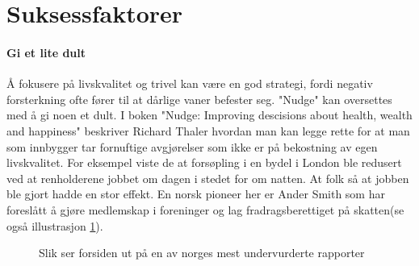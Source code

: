 \documentclass[12pt]{memoir} %
\begin{document}
	\section{Suksessfaktorer}
		\paragraph{Gi et lite dult\\}
			Å fokusere på livskvalitet og trivel kan være en god strategi, fordi negativ forsterkning ofte fører til at dårlige vaner befester seg. "Nudge" kan oversettes med å gi noen et dult. I boken "Nudge: Improving descisions about health, wealth and happiness"\cite{nudge} beskriver Richard Thaler hvordan man kan legge rette for at man som innbygger tar fornuftige avgjørelser som ikke er på bekostning av egen livskvalitet. For eksempel viste de at forsøpling i en bydel i London ble redusert ved at renholderene jobbet om dagen i stedet for om natten\cite{nudge}. At folk så at jobben ble gjort hadde en stor effekt. En norsk pioneer her er Ander Smith som har foreslått å gjøre medlemskap i foreninger og lag fradragsberettiget på skatten\cite{andsmi}(se også illustrasjon \ref{andsmifig}).
					\begin{figure}[ht]
                      \centering
                    	  \captionsetup{singlelinecheck=off}
                      	\caption{Slik ser forsiden ut på en av norges mest undervurderte rapporter}
                      	\label{andsmifig}
                    \end{figure}   
\end{document}
